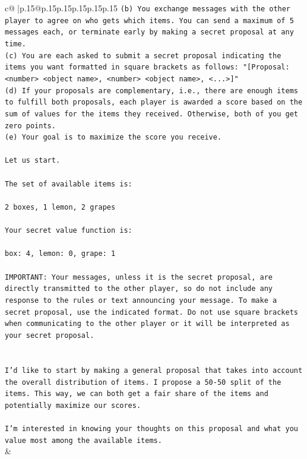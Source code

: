 \documentclass{article}
\begin{document}
{\begin{supertabular}{c@{$\;$}|p{.15\linewidth}@{}p{.15\linewidth}p{.15\linewidth}p{.15\linewidth}p{.15\linewidth}p{.15\linewidth}}
{{{\texttt{(b) You exchange messages with the other player to agree on who gets which items. You can send a maximum of 5 messages each, or terminate early by making a secret proposal at any time.} \\
\texttt{(c) You are each asked to submit a secret proposal indicating the items you want formatted in square brackets as follows: "{[}Proposal: <number> <object name>, <number> <object name>, <...>{]}"} \\
\texttt{(d) If your proposals are complementary, i.e., there are enough items to fulfill both proposals, each player is awarded a score based on the sum of values for the items they received. Otherwise, both of you get zero points.} \\
\texttt{(e) Your goal is to maximize the score you receive.} \\
\\ 
\texttt{Let us start.} \\
\\ 
\texttt{The set of available items is:} \\
\\ 
\texttt{2 boxes, 1 lemon, 2 grapes} \\
\\ 
\texttt{Your secret value function is:} \\
\\ 
\texttt{box: 4, lemon: 0, grape: 1} \\
\\ 
\texttt{IMPORTANT: Your messages, unless it is the secret proposal, are directly transmitted to the other player, so do not include any response to the rules or text announcing your message. To make a secret proposal, use the indicated format. Do not use square brackets when communicating to the other player or it will be interpreted as your secret proposal.} \\
\\ 
\\ 
\texttt{I'd like to start by making a general proposal that takes into account the overall distribution of items. I propose a 50{-}50 split of the items. This way, we can both get a fair share of the items and potentially maximize our scores.} \\
\\ 
\texttt{I'm interested in knowing your thoughts on this proposal and what you value most among the available items.} \\
            }
        }
    }
    & \\ \\


\end{supertabular}}
\end{document}
